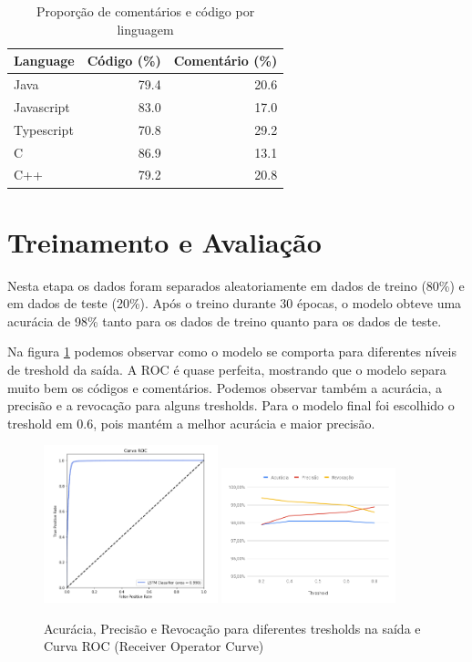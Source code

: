 \documentclass[12pt]{article}
\begin{document}
\begin{table}[ht]
  \centering
  \caption{Proporção de comentários e código por linguagem}
  \label{tab:prop2}
  \begin{tabular}{lrr}
    Language & Código (\%) & Comentário (\%)\\[0.5ex]
    \hline
    Java & 79.4 & 20.6 \\[0.5ex]
    Javascript & 83.0	& 17.0 \\[0.5ex]
    Typescript & 70.8 & 29.2 \\[0.5ex]
    C	& 86.9 & 13.1 \\[0.5ex]
    C++ & 79.2 &	20.8 \\[0.5ex]
    \hline
  \end{tabular}
\end{table}

\section{Treinamento e Avaliação}

Nesta etapa os dados foram separados aleatoriamente em dados de treino (80\%)
e em dados de teste (20\%). Após o treino durante 30 épocas, o modelo obteve uma
acurácia de 98\% tanto para os dados de treino quanto para os dados de teste.

Na figura \ref{fig:tresh} podemos observar como o modelo se comporta para diferentes
níveis de treshold da saída. A ROC é quase perfeita, mostrando que o modelo separa 
muito bem os códigos e comentários. Podemos observar também a acurácia, a precisão
e a revocação para alguns tresholds. Para o modelo final foi escolhido o treshold em 0.6,
pois mantém a melhor acurácia e maior precisão.

\begin{figure}[ht]
  \centering
  \includegraphics[width=0.45\textwidth]{../images/roc06.png}
  \includegraphics[width=0.45\textwidth]{../images/chart-tresh.png}
  \caption{Acurácia, Precisão e Revocação para diferentes tresholds na saída 
  e Curva ROC (Receiver Operator Curve) }
  \label{fig:tresh}
\end{figure}
\end{document}
